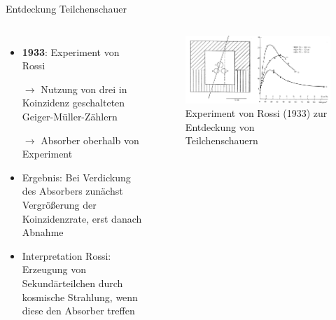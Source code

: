\documentclass[aspectratio=1610, professionalfonts, 9pt, hyperref={colorlinks=false}]{beamer}
\begin{document}
\begin{frame}{Entdeckung Teilchenschauer}
  \begin{columns}
      \begin{itemize}
        \setlength\itemsep{0.5em}
        \item \textbf{1933}: Experiment von Rossi\item[$\rightarrow$]
        Nutzung von drei in Koinzidenz geschalteten Geiger-Müller-Zählern
        \item[$\rightarrow$] Absorber oberhalb von Experiment
        \item Ergebnis: Bei Verdickung des Absorbers zunächst Vergrößerung der Koinzidenzrate, erst danach Abnahme
        \item Interpretation Rossi: Erzeugung von Sekundärteilchen durch kosmische Strahlung, wenn diese den Absorber treffen
      \end{itemize}
        \vspace*{10px}
  
      \begin{figure}
          \centering
          \includegraphics[width=\linewidth]{images/Rossis-transition-curve-The-experiment-in-which-the-abundant-production-of-secondary.png}
          \caption{Experiment von Rossi (1933) zur Entdeckung von Teilchenschauern \cite{9789400754225}}
      \end{figure}
  \end{columns}
\end{frame}
\end{document}
